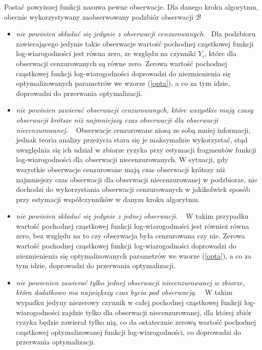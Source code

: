 Postać powyższej funkcji nasuwa pewne obserwacje. Dla danego kroku algorytmu, obecnie wykorzystywany zaobserwowany podzbiór obserwacji \(\mathcal{B}\)
\begin{itemize}
\item \textit{nie powinien składać się jedynie z obserwacji cenzurowanych}. \newline \ \newline Dla podzbioru zawierającego jedynie takie obserwacje wartość pochodnej cząstkowej funkcji log-wiarogodności jest równa zero, ze względu na czynniki $Y_i$, które dla obserwacji cenzurowanych są równe zero. Zerowa wartość pochodnej cząstkowej funkcji log-wiarogodności doprowadzi do niezmienienia się optymalizowanych parametrów we wzorze (\ref{opta}), a co za tym idzie, doprowadzi do przerwania optymalizacji.
\item \textit{nie powinien zawierać obserwacji cenzurowanych, które wszystkie mają czasy obserwacji krótsze niż najmniejszy czas obserwacji dla obserwacji niecenzurowanej}. \newline \ \newline
Obserwacje cenzurowane niosą ze sobą mniej informacji, jednak teoria analizy przeżycia stara się je maksymalnie wykorzystać, stąd uwzględnia się ich udział w zbiorze ryzyka przy estymacji fragmentów funkcji log-wiarogodności dla obserwacji niecenzurowanych. W sytuacji, gdy wszystkie obserwacje cenzurowane mają czas obserwacji krótszy niż najmniejszy czas obserwacji dla obserwacji niecenzurowanej w podzbiorze, nie dochodzi do wykorzystania obserwacji cenzurowanych w jakikolwiek sposób przy estymacji współczynników w danym kroku algorytmu.
\item \textit{nie powinien składać się jedynie z jednej obserwacji}. \newline \ \newline 
W takim przypadku wartość pochodnej cząstkowej funkcji log-wiarogodności jest również równa zero, bez względu na to czy obserwacja była cenzurowana czy nie. Zerowa wartość pochodnej cząstkowej funkcji log-wiarogodności doprowadzi do niezmienienia się optymalizowanych parametrów we wzorze (\ref{opta}), a co za tym idzie, doprowadzi do przerwania optymalizacji.
\item \textit{nie powienien zawierać tylko jednej obserwacji niecenzurowanej w zbiorze, która dodatkowo ma największy czas bycia pod obserwacją}. \newline \ \newline
W takim wypadku jedyny niezerowy czynnik w całej pochodnej cząstkowej funkcji log-wiarogodności zajdzie tylko dla obserwacji niecenzurowanej, dla której zbiór ryzyka będzie zawierał tylko nią, co da ostatecznie zerową wartość pochodnej cząstkowej optymalizowanej funkcji log-wiarogodności, co doprowadzi do przerwania optymalizacji.
\end{itemize}
\newpage
